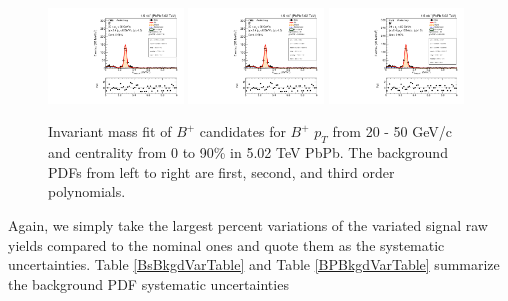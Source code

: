 \begin{figure}[hbtp]
\begin{center}
\includegraphics[width=0.32\textwidth]{Figures/Chapter5/data_PbPb_1_Bpt_2050_1st_doubly0_ntKp.pdf}
\includegraphics[width=0.32\textwidth]{Figures/Chapter5/data_PbPb_1_Bpt_2050_2nd_doubly0_ntKp.pdf}
\includegraphics[width=0.32\textwidth]{Figures/Chapter5/data_PbPb_1_Bpt_2050_3rd_doubly0_ntKp.pdf}
\caption{Invariant mass fit of $B^+$ candidates for $B^+$ $p_T$ from 20 - 50 GeV/c and centrality from 0 to 90\% in 5.02 TeV PbPb. The background PDFs from left to right are first, second, and third order polynomials.}
\label{BPBkgdVar}
\end{center}
\end{figure}

Again, we simply take the largest percent variations of the variated signal raw yields compared to the nominal ones and quote them as the systematic uncertainties. Table \ref{BsBkgdVarTable} and Table \ref{BPBkgdVarTable} summarize the background PDF systematic uncertainties 

